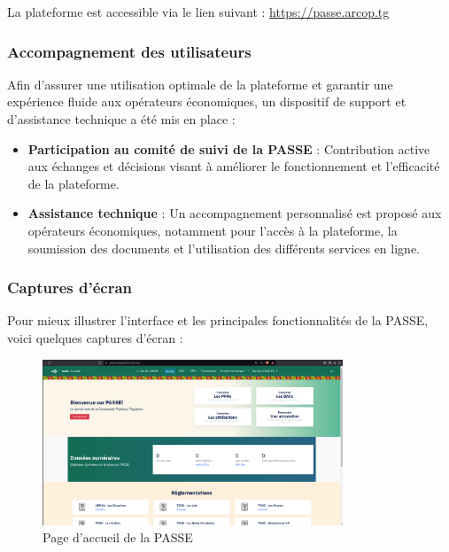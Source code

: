 La plateforme est accessible via le lien suivant :  
\url{https://passe.arcop.tg}  

\subsubsection{Accompagnement des utilisateurs}
Afin d’assurer une utilisation optimale de la plateforme et garantir une expérience fluide aux opérateurs économiques, un dispositif de support et d’assistance technique a été mis en place :

\begin{itemize}
    \item \textbf{Participation au comité de suivi de la \ac{PASSE}} : Contribution active aux échanges et décisions visant à améliorer le fonctionnement et l'efficacité de la plateforme.
    
    \item \textbf{Assistance technique} : Un accompagnement personnalisé est proposé aux opérateurs économiques, notamment pour l’accès à la plateforme, la soumission des documents et l’utilisation des différents services en ligne.
\end{itemize}


\subsubsection{Captures d'écran}
Pour mieux illustrer l'interface et les principales fonctionnalités de la \ac{PASSE}, voici quelques captures d’écran :

\begin{figure}[H]
    \centering
    \includegraphics[width=0.8\textwidth]{images/passe/home.png}
    \caption{Page d'accueil de la \ac{PASSE}}
    \label{fig:page-accueil_pass}
\end{figure}

